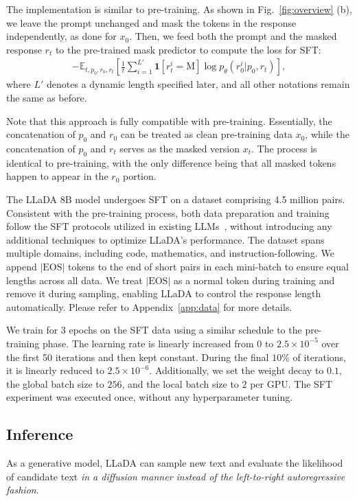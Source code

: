 \documentclass{article}
\begin{document}
The implementation is similar to pre-training. As shown in Fig.~\ref{fig:overview} (b), we leave the prompt unchanged and mask the tokens in the response independently, as done for \(x_0\). Then, we feed both the prompt and the masked response \(r_t\) to the pre-trained mask predictor to compute the loss for SFT:
\begin{align}
\label{eq:sft-objective}
- \mathbb{E}_{t, p_0, r_0, r_t} \left[\frac{1}{t} \sum_{i=1}^{L'} \textbf{1}[r_t^i = \textrm{M}] \log p_{\theta}(r_0^i|p_0, r_t) \right],
\end{align}
where \(L'\) denotes a dynamic length specified later, and all other notations remain the same as before. 

Note that this approach is fully compatible with pre-training. Essentially, the concatenation of \(p_0\) and \(r_0\) can be treated as clean pre-training data \(x_0\), while the concatenation of \(p_0\) and \(r_t\) serves as the masked version \(x_t\). The process is identical to pre-training, with the only difference being that all masked tokens happen to appear in the \(r_0\) portion.

The LLaDA 8B model undergoes SFT on a dataset comprising 4.5 million pairs. Consistent with the pre-training process, both data preparation and training follow the SFT protocols utilized in existing LLMs~\citep{qwen2,qwen2.5}, without introducing any additional techniques to optimize LLaDA's performance.
The dataset spans multiple domains, including code, mathematics, and instruction-following. We append $|\text{EOS}|$ tokens to the end of short pairs in each mini-batch to ensure equal lengths across all data. We treat $|\text{EOS}|$ as a normal token during training and remove it during sampling, enabling LLaDA to control the response length automatically. Please refer to Appendix~\ref{app:data} for more details. 

We train for 3 epochs on the SFT data using a similar schedule to the pre-training phase. The learning rate is linearly increased from 0 to $2.5 \times 10^{-5}$ over the first 50 iterations and then kept constant. During the final $10\%$ of iterations, it is linearly reduced to $2.5 \times 10^{-6}$. Additionally, we set the weight decay to $0.1$, the global batch size to $256$, and the local batch size to $2$ per GPU. The SFT experiment was executed once, without any hyperparameter tuning.


\subsection{Inference}
\label{sec:inference}
As a generative model, LLaDA can sample new text and evaluate the likelihood of candidate text \emph{in a diffusion manner instead of the left-to-right autoregressive fashion}.
\end{document}

